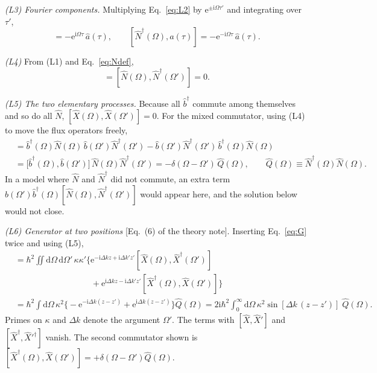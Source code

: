\documentclass[aps,pra,onecolumn,notitlepage,11pt,amsmath,amssymb,nofootinbib]{revtex4-2}
\newcommand{\Nop}{\hat N}
\newcommand{\Qop}{\hat Q}
\newcommand{\Xop}{\hat X}
\newcommand{\dd}{\mathrm{d}}
\newcommand{\ee}{\mathrm{e}}
\newcommand{\ii}{\mathrm{i}}
\begin{document}
\emph{(L3) Fourier components.} Multiplying Eq.~\eqref{eq:L2} by
$\ee^{\pm\ii\Omega\tau'}$ and integrating over $\tau'$,
\begin{equation}
[\Nop(\Omega),\hat a(\tau)]=-\ee^{\ii\Omega\tau}\,\hat a(\tau),\qquad
[\Nop^\dagger(\Omega),\hat a(\tau)]=-\ee^{-\ii\Omega\tau}\,\hat a(\tau).
\label{eq:L3}
\end{equation}

\emph{(L4)} From (L1) and Eq.~\eqref{eq:Ndef},
\begin{equation}
[\Nop(\Omega),\Nop(\Omega')]=[\Nop(\Omega),\Nop^\dagger(\Omega')]=0 .
\label{eq:L4}
\end{equation}

\emph{(L5) The two elementary processes.} Because all $\hat b^\dagger$ commute
among themselves and so do all $\Nop$,
$[\Xop(\Omega),\Xop(\Omega')]=0$. For the mixed commutator, using (L4) to move
the flux operators freely,
\begin{align}
[\Xop(\Omega),\Xop^\dagger(\Omega')]
&=\hat b^\dagger(\Omega)\Nop(\Omega)\,\hat b(\Omega')\Nop^\dagger(\Omega')
-\hat b(\Omega')\Nop^\dagger(\Omega')\,\hat b^\dagger(\Omega)\Nop(\Omega)\nonumber\\
&=\big[\hat b^\dagger(\Omega),\hat b(\Omega')\big]\,\Nop(\Omega)\Nop^\dagger(\Omega')
=-\delta(\Omega-\Omega')\,\Qop(\Omega),\qquad
\Qop(\Omega)\equiv\Nop^\dagger(\Omega)\Nop(\Omega).
\label{eq:L5}
\end{align}
In a model where $\Nop$ and $\Nop^\dagger$ did not commute, an extra term
$\hat b(\Omega')\hat b^\dagger(\Omega)[\Nop(\Omega),\Nop^\dagger(\Omega')]$
would appear here, and the solution below would not close.

\emph{(L6) Generator at two positions} [Eq.~(6) of the theory note].
Inserting Eq.~\eqref{eq:G} twice and using (L5),
\begin{align}
[\hat G(z),\hat G(z')]
&=\hbar^2\!\iint\!\dd\Omega\,\dd\Omega'\,\kappa\kappa'
\Big\{\ee^{-\ii\Delta kz+\ii\Delta k'z'}[\Xop(\Omega),\Xop^\dagger(\Omega')]\nonumber\\
&\hspace{9em}+\ee^{\ii\Delta kz-\ii\Delta k'z'}[\Xop^\dagger(\Omega),\Xop(\Omega')]\Big\}\nonumber\\
&=\hbar^2\!\int\!\dd\Omega\,\kappa^2
\Big\{-\ee^{-\ii\Delta k(z-z')}+\ee^{\ii\Delta k(z-z')}\Big\}\Qop(\Omega)
=2\ii\hbar^2\!\int_0^\infty\!\!\dd\Omega\,\kappa^2
\sin[\Delta k\,(z-z')]\;\Qop(\Omega).
\label{eq:L6}
\end{align}
Primes on $\kappa$ and $\Delta k$ denote the argument $\Omega'$. The terms
with $[\Xop,\Xop']$ and $[\Xop^\dagger,\Xop'^\dagger]$ vanish. The second
commutator shown is $[\Xop^\dagger(\Omega),\Xop(\Omega')]
=+\delta(\Omega-\Omega')\Qop(\Omega)$.
\end{document}
